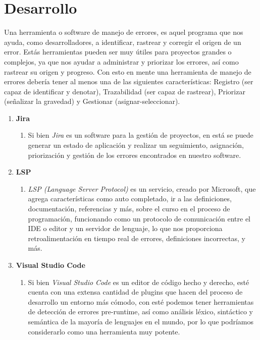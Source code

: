 \documentclass{dense_template}
\begin{document}
\section{Desarrollo}
Una herramienta o software de manejo de errores, es aquel programa que nos ayuda, como desarrolladores, a identificar, rastrear y corregir el origen de un error. Estás herramientas pueden ser muy útiles para proyectos grandes o complejos, ya que nos ayudar a administrar y priorizar los errores, así como rastrear su origen y progreso. Con esto en mente una herramienta de manejo de errores debería tener al menos una de las siguientes características: Registro (ser capaz de identificar y denotar), Trazabilidad (ser capaz de rastrear), Priorizar (señalizar la gravedad) y Gestionar (asignar-seleccionar).
\begin{enumerate}
    \item \textbf{Jira}
    \begin{enumerate}
        \item Si bien \textit{Jira} es un software para la gestión de proyectos, en está se puede generar un estado de aplicación y realizar un seguimiento, asignación, priorización y gestión de los errores encontrados en nuestro software.
    \end{enumerate}
    \item \textbf{LSP}
    \begin{enumerate}
        \item \textit{LSP (Language Server Protocol)} es un servicio, creado por Microsoft, que agrega características como auto completado, ir a las definiciones, documentación, referencias y más, sobre el curso en el proceso de programación, funcionando como un protocolo de comunicación entre el IDE o editor y un servidor de lenguaje, lo que nos proporciona retroalimentación en tiempo real de errores, definiciones incorrectas, y más. 
    \end{enumerate}
    \item \textbf{Visual Studio Code}
    \begin{enumerate}
        \item Si bien \textit{Visual Studio Code} es un editor de código hecho y derecho, esté cuenta con una extensa cantidad de plugins que hacen del proceso de desarrollo un entorno más cómodo, con esté podemos tener herramientas de detección de errores pre-runtime, así como análisis léxico, sintáctico y semántica de la mayoría de lenguajes en el mundo, por lo que podríamos considerarlo como una herramienta muy potente.
    \end{enumerate}
\end{enumerate}
\pagebreak
\end{document}
